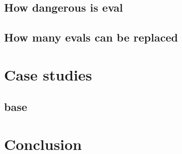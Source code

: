 \documentclass[conference]{IEEEtran}
\begin{document}
\subsection{How dangerous is eval}

\subsection{How many evals can be replaced}

\section{Case studies}

\subsection{base}


\section{Conclusion}



\end{document}
